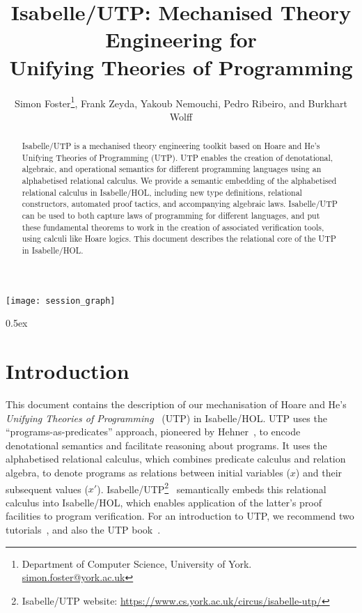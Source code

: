 \documentclass[11pt,a4paper]{article}
\begin{document}
\title{Isabelle/UTP: Mechanised Theory Engineering for \\ Unifying Theories of Programming}

\author{Simon Foster\footnote{Department of Computer Science, University of York. \href{mailto:simon.foster@york.ac.uk}{simon.foster@york.ac.uk}}, Frank Zeyda, Yakoub Nemouchi, Pedro Ribeiro, and Burkhart Wolff}

\maketitle

\begin{abstract}
  Isabelle/UTP is a mechanised theory engineering toolkit based on Hoare and He's Unifying Theories of Programming
  (UTP). UTP enables the creation of denotational, algebraic, and operational semantics for different programming
  languages using an alphabetised relational calculus. We provide a semantic embedding of the alphabetised relational
  calculus in Isabelle/HOL, including new type definitions, relational constructors, automated proof tactics, and
  accompanying algebraic laws. Isabelle/UTP can be used to both capture laws of programming for different languages, and
  put these fundamental theorems to work in the creation of associated verification tools, using calculi like Hoare
  logics. This document describes the relational core of the UTP in Isabelle/HOL.
\end{abstract}

\tableofcontents

\begin{center}
  \texttt{[image: session\_graph]}
\end{center}

\parindent 0pt\parskip 0.5ex

\section{Introduction}

This document contains the description of our mechanisation of Hoare and He's \emph{Unifying Theories of
  Programming}~\cite{Hoare&98,Cavalcanti&06} (UTP) in Isabelle/HOL. UTP uses the ``programs-as-predicates'' approach, 
pioneered by Hehner~\cite{Hehner1988,Hehner1990,Hehner93}, to encode denotational semantics and facilitate reasoning about programs. 
It uses the alphabetised relational calculus, which combines predicate calculus and relation algebra, to denote programs as relations 
between initial variables ($x$) and their subsequent values ($x'$). Isabelle/UTP\footnote{Isabelle/UTP website:
  \url{https://www.cs.york.ac.uk/circus/isabelle-utp/}}~\cite{Foster16a,Foster16c,Foster14c} semantically embeds this
relational calculus into Isabelle/HOL, which enables application of the latter's proof facilities to program
verification. For an introduction to UTP, we recommend two tutorials~\cite{Cavalcanti04,Cavalcanti&06}, and also the UTP
book~\cite{Hoare&98}.
\end{document}
